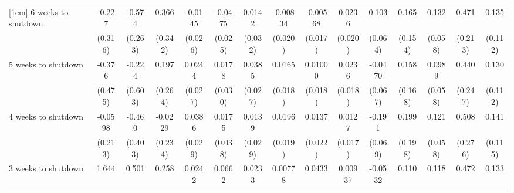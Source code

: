 \begin{table}[htbp]
\begin{tabular}{l*{14}{c}}
[1em]
6 weeks to shutdown &      -0.227         &      -0.574\sym{**} &       0.366         &     -0.0145         &     -0.0475\sym{*}  &      0.0142         &    -0.00834         &    -0.00568         &      0.0236         &       0.103         &       0.165         &       0.132\sym{**} &       0.471\sym{**} &       0.135         \\
                    &     (0.316)         &     (0.263)         &     (0.342)         &     (0.026)         &     (0.025)         &     (0.032)         &     (0.020)         &     (0.017)         &     (0.020)         &     (0.064)         &     (0.154)         &     (0.058)         &     (0.213)         &     (0.112)         \\
[1em]
5 weeks to shutdown &      -0.376         &      -0.224         &       0.197         &      0.0244         &      0.0178         &      0.0385         &      0.0165         &     0.01000         &      0.0236         &     -0.0470         &       0.158         &      0.0989\sym{*}  &       0.440\sym{*}  &       0.130         \\
                    &     (0.475)         &     (0.603)         &     (0.264)         &     (0.027)         &     (0.030)         &     (0.027)         &     (0.018)         &     (0.018)         &     (0.018)         &     (0.067)         &     (0.168)         &     (0.058)         &     (0.247)         &     (0.112)         \\
[1em]
4 weeks to shutdown &     -0.0598         &      -0.460         &     -0.0229         &      0.0386         &      0.0175         &      0.0139         &      0.0196         &      0.0137         &      0.0127         &      -0.191\sym{***}&       0.199         &       0.121\sym{**} &       0.508\sym{*}  &       0.141         \\
                    &     (0.213)         &     (0.403)         &     (0.234)         &     (0.029)         &     (0.038)         &     (0.029)         &     (0.019)         &     (0.022)         &     (0.017)         &     (0.069)         &     (0.198)         &     (0.058)         &     (0.276)         &     (0.115)         \\
[1em]
3 weeks to shutdown &       1.644         &       0.501         &       0.258         &      0.0242         &      0.0662\sym{*}  &      0.0233         &     0.00778         &      0.0433\sym{**} &     0.00937         &     -0.0532         &       0.110         &       0.118\sym{**} &       0.472\sym{**} &       0.133         \\

\end{tabular}
\end{table}
